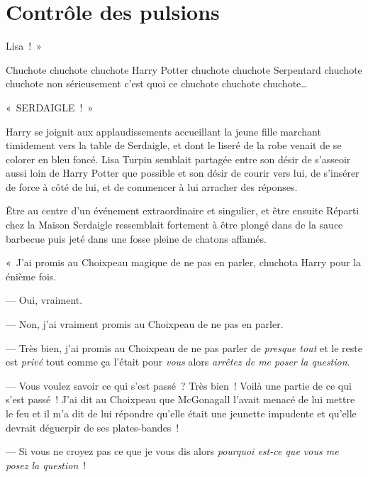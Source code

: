 
{
  \let\specialmark\footnotemark
  \chapter{Contrôle des pulsions}
}


 Lisa~!~»

\hplettrineextrapara
Chuchote chuchote chuchote Harry Potter chuchote chuchote Serpentard chuchote chuchote non sérieusement c'est quoi ce chuchote chuchote chuchote…

«~SERDAIGLE~!~»

Harry se joignit aux applaudissements accueillant la jeune fille marchant timidement vers la table de Serdaigle, et dont le liseré de la robe venait de se colorer en bleu foncé.
Lisa Turpin semblait partagée entre son désir de s'asseoir aussi loin de Harry Potter que possible et son désir de courir vers lui, de s'insérer de force à côté de lui, et de commencer à lui arracher des réponses.

Être au centre d'un événement extraordinaire et singulier, et être ensuite Réparti chez la Maison Serdaigle ressemblait fortement à être plongé dans de la sauce barbecue puis jeté dans une fosse pleine de chatons affamés.

«~J'ai promis au Choixpeau magique de ne pas en parler, chuchota Harry pour la énième fois.

--- Oui, vraiment.

--- Non, j'ai vraiment promis au Choixpeau de ne pas en parler.

--- Très bien, j'ai promis au Choixpeau de ne pas parler de \emph{presque tout} et le reste est \emph{privé} tout comme ça l'était pour \emph{vous} alors \emph{arrêtez de me poser la question}.

--- Vous voulez savoir ce qui s'est passé~? Très bien~!
Voilà une partie de ce qui s'est passé~!
J'ai dit au Choixpeau que McGonagall l'avait menacé de lui mettre le feu et il m'a dit de lui répondre qu'elle était une jeunette impudente et qu'elle devrait déguerpir de ses plates-bandes~!

--- Si vous ne croyez pas ce que je vous dis alors \emph{pourquoi est-ce que vous me posez la question}~!

